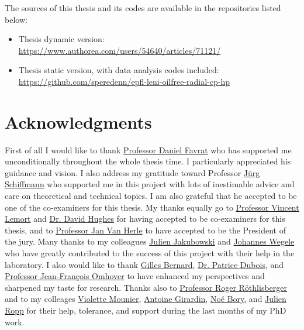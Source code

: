 The sources of this thesis and its codes are available in the
repositories listed below:

\begin{itemize}
\item Thesis dynamic version:\\
  \href{https://www.authorea.com/users/54640/articles/71121/}{https://www.authorea.com/users/54640/articles/71121/}
\item Thesis static version, with data analysis codes included:\\
  \href{https://github.com/speredenn/epfl-leni-oilfree-radial-cp-hp}{https://github.com/speredenn/epfl-leni-oilfree-radial-cp-hp}
\end{itemize}

\section*{Acknowledgments}
\label{sec:thanks}

First of all I would like to thank
\href{https://ch.linkedin.com/pub/daniel-favrat/9/564/3a5}{Professor
  Daniel Favrat} who has supported me unconditionally throughout the
whole thesis time. I particularly appreciated his guidance and
vision. I also address my gratitude toward Professor
\href{http://people.epfl.ch/jurg.schiffmann}{Jürg
  Schiffmann} who supported me in this project with lots of
inestimable advice and care on theoretical and technical topics. I am
also grateful that he accepted to be one of the co-examiners for this
thesis. My thanks equally go to
\href{https://be.linkedin.com/pub/vincent-lemort/19/860/bb6}{Professor
  Vincent Lemort} and
\href{https://uk.linkedin.com/pub/david-hughes/13/658/29}{Dr. David
  Hughes} for having accepted to be co-examiners for this thesis, and
to \href{http://people.epfl.ch/jan.vanherle}{Professor Jan Van Herle} to have accepted to be the
President of the jury. Many thanks to my colleagues
\href{https://ch.linkedin.com/pub/julien-jakubowski/9/599/67a}{Julien
  Jakubowski} and
\href{https://de.linkedin.com/pub/johannes-wegele/23/27a/897/en}{Johannes
  Wegele} who have greatly contributed to the success of this project
with their help in the laboratory. I also would like to thank
\href{https://fr.linkedin.com/pub/gilles-bernard/28/2a7/534/en}{Gilles
  Bernard},
\href{https://fr.linkedin.com/pub/patrice-dubois/23/2aa/922/en}{Dr. Patrice
  Dubois}, and \href{https://fr.linkedin.com/in/jfomhover}{Professor
  Jean-François Omhover} to have enhanced my perspectives and
sharpened my taste for research. Thanks also to
\href{http://www.sib.heig-vd.ch/institut/Lists/quipe/DispForm.aspx?ID=3}{Professor
  Roger Röthlisberger} and to my colleages
\href{https://ch.linkedin.com/pub/violette-mounier/80/347/952/en}{Violette
  Mounier},
\href{https://ch.linkedin.com/pub/antoine-girardin/36/47a/5a1/en}{Antoine
  Girardin},
\href{https://ch.linkedin.com/pub/noé-bory/42/276/ba7}{Noé Bory}, and
\href{http://www.sib.heig-vd.ch/institut/Lists/quipe/DispForm.aspx?ID=1}{Julien
  Ropp} for their help, tolerance, and support during the last months
of my PhD work.

